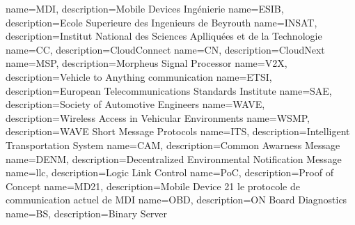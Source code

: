  {
	name=MDI,
	description={Mobile Devices Ingénierie}
}
 {
	name=ESIB,
	description={Ecole Superieure des Ingenieurs de Beyrouth}
}
 {
	name=INSAT,
	description={Institut National des Sciences Aplliquées et de la Technologie}
}
 {
	name=CC,
	description={CloudConnect}
}
 {
	name=CN,
	description={CloudNext}
}
 {
	name=MSP,
	description={Morpheus Signal Processor}
}
 {
	name=V2X,
	description={Vehicle to Anything communication}
}
 {
	name=ETSI,
	description={European Telecommunications Standards Institute}
}
 {
	name=SAE,
	description={Society of Automotive Engineers}
}
 {
	name=WAVE,
	description={Wireless Access in Vehicular Environments}
}
 {
	name=WSMP,
	description={WAVE Short Message Protocols}
}
 {
	name=ITS,
	description={Intelligent Transportation System}
}
 {
	name=CAM,
	description={Common Awarness Message}
}
 {
	name=DENM,
	description={Decentralized Environmental Notification Message}
}
 {
	name=llc,
	description={Logic Link Control}
}
 {
	name=PoC,
	description={Proof of Concept}
}
 {
	name=MD21,
	description={Mobile Device 21 le protocole de communication actuel de MDI}
}
 {
	name=OBD,
	description={ON Board Diagnostics}
}
 {
	name=BS,
	description={Binary Server}
}
